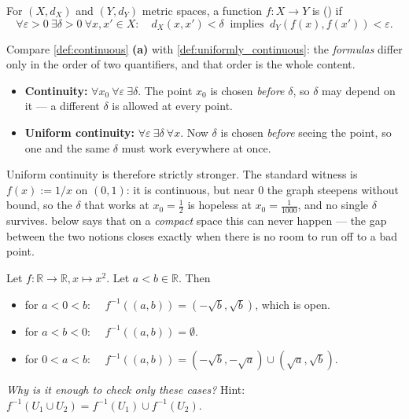 \begin{definition}
\label{def:uniformly_continuous}
For $(X,d_X)$ and $(Y,d_Y)$ metric spaces, a function $f : X \to Y$ is  () if
\[\forall \varepsilon > 0 \ \exists \delta > 0 \ \forall x, x' \in X : \quad d_X(x,x') < \delta \ \text{ implies } \ d_Y(f(x),f(x')) < \varepsilon.\]
\end{definition}

\begin{importantremark}
\label{rem:continuity_vs_uniform_continuity}
Compare \cref{def:continuous} \textbf{(a)} with \cref{def:uniformly_continuous}: the
\emph{formulas} differ only in the order of two quantifiers, and that order is the whole
content.
\begin{itemize}
  \item \textbf{Continuity:} $\forall x_0\ \forall\varepsilon\ \exists\delta$. The point $x_0$
    is chosen \emph{before} $\delta$, so $\delta$ may depend on it --- a different $\delta$ is
    allowed at every point.
  \item \textbf{Uniform continuity:} $\forall\varepsilon\ \exists\delta\ \forall x$. Now
    $\delta$ is chosen \emph{before} seeing the point, so one and the same $\delta$ must work
    everywhere at once.
\end{itemize}
Uniform continuity is therefore strictly stronger. The standard witness is
$f(x) := 1/x$ on $(0,1)$: it is continuous, but near $0$ the graph steepens without bound, so
the $\delta$ that works at $x_0 = \tfrac12$ is hopeless at $x_0 = \tfrac{1}{1000}$, and no
single $\delta$ survives.  below says that on a
\emph{compact} space this can never happen --- the gap between the two notions closes exactly
when there is no room to run off to a bad point.
\end{importantremark}

\begin{example}[$f(x) = x^2$]
Let $f : \mathbb{R} \to \mathbb{R}, x \mapsto x^2$. Let $a < b \in \mathbb{R}$. Then
\begin{itemize}
  \item for $a < 0 < b$: $\quad f^{-1}((a,b)) = (-\sqrt{b}, \sqrt{b})$, which is open.
  \item for $a < b < 0$: $\quad f^{-1}((a,b)) = \emptyset$.
  \item for $0 < a < b$: $\quad f^{-1}((a,b)) = (-\sqrt{b}, -\sqrt{a}) \cup (\sqrt{a}, \sqrt{b})$.
\end{itemize}
\textit{Why is it enough to check only these cases?} Hint:
$f^{-1}(U_1 \cup U_2) = f^{-1}(U_1) \cup f^{-1}(U_2)$.
\end{example}

